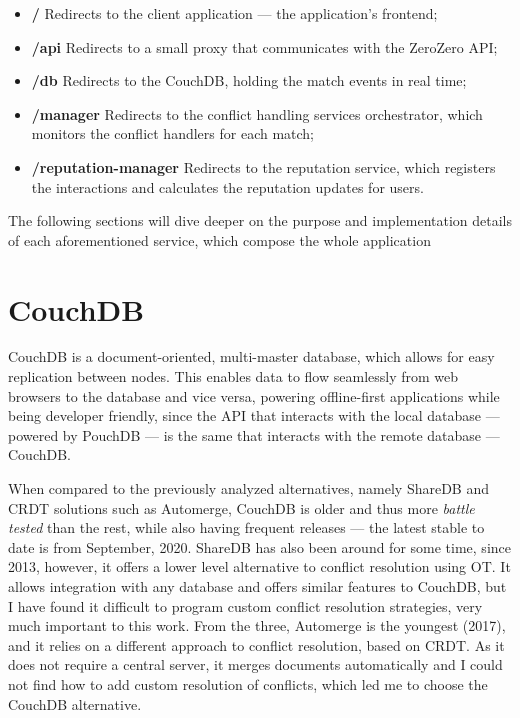 \begin{itemize}
    \item \textbf{/} Redirects to the client application --- the application's frontend;
    \item \textbf{/api} Redirects to a small proxy that communicates with the ZeroZero API;
    \item \textbf{/db} Redirects to the CouchDB, holding the match events in real time;
    \item \textbf{/manager} Redirects to the conflict handling services orchestrator, which monitors the conflict handlers for each match;
    \item \textbf{/reputation-manager} Redirects to the reputation service, which registers the interactions and calculates the reputation updates for users.
\end{itemize}

The following sections will dive deeper on the purpose and implementation details of each aforementioned service, which compose the whole application 

\section{CouchDB}

CouchDB is a document-oriented, multi-master database, which allows for easy replication between nodes. This enables data to flow seamlessly from web browsers to the database and vice versa, powering offline-first applications while being developer friendly, since the API that interacts with the local database --- powered by PouchDB --- is the same that interacts with the remote database --- CouchDB.

When compared to the previously analyzed alternatives, namely ShareDB and CRDT solutions such as Automerge, CouchDB is older and thus more \textit{battle tested} than the rest, while also having frequent releases --- the latest stable to date is from September, 2020. ShareDB has also been around for some time, since 2013, however, it offers a lower level alternative to conflict resolution using OT. It allows integration with any database and offers similar features to CouchDB, but I have found it difficult to program custom conflict resolution strategies, very much important to this work. From the three, Automerge is the youngest (2017), and it relies on a different approach to conflict resolution, based on CRDT. As it does not require a central server, it merges documents automatically and I could not find how to add custom resolution of conflicts, which led me to choose the CouchDB alternative.

